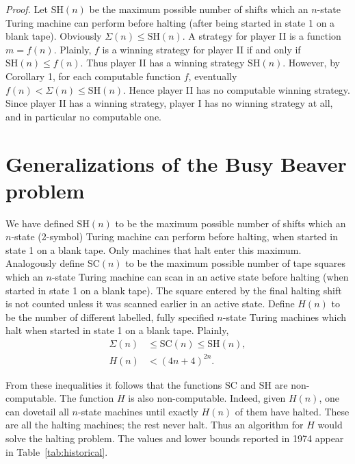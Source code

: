\documentclass[11pt]{article}
\newcommand{\origpage}[1]{\marginnote{\footnotesize\textbf{[#1]}}}
\newcommand{\SH}{\mathrm{SH}}
\newcommand{\SC}{\mathrm{SC}}
\begin{document}
\emph{Proof.} Let $\SH(n)$ be the maximum possible number of shifts which an $n$-state Turing machine can perform before halting (after being started in state 1 on a blank tape). Obviously $\Sigma(n) \leq \SH(n)$. A strategy for player II is a function $m=f(n)$. Plainly, $f$ is a winning strategy for player II if and only if $\SH(n) \leq f(n)$. Thus player II has a winning strategy $\SH(n)$. However, by Corollary 1, for each computable function $f$, eventually $f(n)<\Sigma(n) \leq \SH(n)$. Hence player II has no computable winning strategy. Since player II has a winning strategy, player I has no winning strategy at all, and in particular no computable one.
\section{Generalizations of the Busy Beaver problem} We have defined $\SH(n)$ to be the maximum possible number of shifts which an $n$-state (2-symbol) Turing machine can perform before halting, when started in state 1 on a blank tape. Only machines that halt enter this maximum. Analogously define $\SC(n)$ to be the maximum possible number of tape squares which an $n$-state Turing machine can scan in an active state before halting (when started in state 1 on a blank tape). The square entered by the final halting shift is not counted unless it was scanned earlier in an active state. Define $H(n)$ to be the number of different labelled, fully specified $n$-state Turing machines which halt when started in state 1 on a blank tape. Plainly,
\begin{align}
\Sigma(n)&\leq\SC(n)\leq\SH(n), \tag{1}\\
H(n)&<(4n+4)^{2n}. \tag{2}
\end{align}

From these inequalities it follows that the functions $\SC$ and $\SH$ are non-computable. The function $H$ is also non-computable. Indeed, given $H(n)$, one can dovetail all $n$-state machines until exactly $H(n)$ of them have halted. These are all the halting machines; the rest never halt. Thus an algorithm for $H$ would solve the halting problem. The
\origpage{736}values and lower bounds reported in 1974 appear in Table~\ref{tab:historical}.
\end{document}
